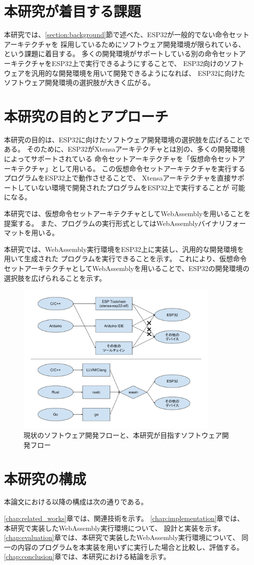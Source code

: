 \section{本研究が着目する課題}

本研究では、\ref{section:background}節で述べた、ESP32が一般的でない命令セットアーキテクチャを
採用しているためにソフトウェア開発環境が限られている、という課題に着目する。
多くの開発環境がサポートしている別の命令セットアーキテクチャをESP32上で実行できるようにすることで、
ESP32向けのソフトウェアを汎用的な開発環境を用いて開発できるようになれば、
ESP32に向けたソフトウェア開発環境の選択肢が大きく広がる。

\section{本研究の目的とアプローチ}

本研究の目的は、ESP32に向けたソフトウェア開発環境の選択肢を広げることである。
そのために、ESP32がXtensaアーキテクチャとは別の、多くの開発環境によってサポートされている
命令セットアーキテクチャを「仮想命令セットアーキテクチャ」として用いる。
この仮想命令セットアーキテクチャを実行するプログラムをESP32上で動作させることで、
Xtensaアーキテクチャを直接サポートしていない環境で開発されたプログラムをESP32上で実行することが
可能になる。

本研究では、仮想命令セットアーキテクチャとしてWebAssemblyを用いることを提案する。
また、プログラムの実行形式としてはWebAssemblyバイナリフォーマットを用いる。

本研究では、WebAssembly実行環境をESP32上に実装し、汎用的な開発環境を用いて生成された
プログラムを実行できることを示す。
これにより、仮想命令セットアーキテクチャとしてWebAssemblyを用いることで、ESP32の開発環境の
選択肢を広げられることを示す。

\begin{figure}[htbp]
  \caption{現状のソフトウェア開発フローと、本研究が目指すソフトウェア開発フロー}
  \label{fig:new_world}
  \begin{center}
    \includegraphics[bb=0 0 800 600,width=10cm]{img/new_world.pdf}
  \end{center}
\end{figure}

\section{本研究の構成}

本論文における以降の構成は次の通りである。

\ref{chap:related_works}章では、関連技術を示す。
\ref{chap:implementation}章では、本研究で実装したWebAssembly実行環境について、
設計と実装を示す。
\ref{chap:evaluation}章では、本研究で実装したWebAssembly実行環境について、
同一の内容のプログラムを本実装を用いずに実行した場合と比較し、評価する。
\ref{chap:conclusion}章では、本研究における結論を示す。
